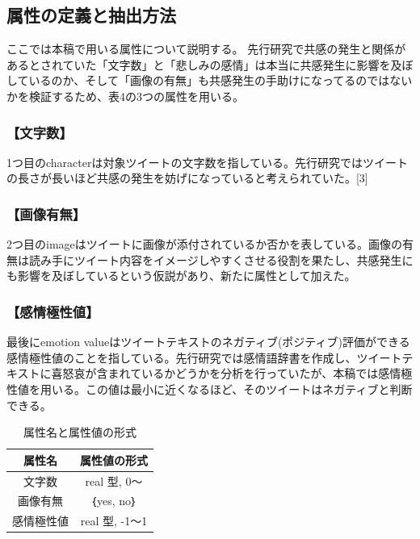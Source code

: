 \documentclass[dvipdfmx]{issj}
\begin{document}
\subsection{属性の定義と抽出方法}  %
ここでは本稿で用いる属性について説明する。
先行研究で共感の発生と関係があるとされていた「文字数」と「悲しみの感情」は本当に共感発生に影響を及ぼしているのか、そして「画像の有無」も共感発生の手助けになってるのではないかを検証するため、表4の3つの属性を用いる。


\subsubsection{【文字数】}
1つ目のcharacterは対象ツイートの文字数を指している。先行研究ではツイートの長さが長いほど共感の発生を妨げになっていると考えられていた。[3]

\subsubsection{【画像有無】}
2つ目のimageはツイートに画像が添付されているか否かを表している。画像の有無は読み手にツイート内容をイメージしやすくさせる役割を果たし、共感発生にも影響を及ぼしているという仮説があり、新たに属性として加えた。

\subsubsection{【感情極性値】}
最後にemotion valueはツイートテキストのネガティブ(ポジティブ)評価ができる感情極性値のことを指している。先行研究では感情語辞書を作成し、ツイートテキストに喜怒哀が含まれているかどうかを分析を行っていたが、本稿では感情極性値を用いる。この値は最小に近くなるほど、そのツイートはネガティブと判断できる。






\begin{table}[t]\centering
\caption{属性名と属性値の形式}\label{tbl:font}
\begin{small}
\begin{tabular}{|c|c|} \hline
属性名            & 属性値の形式\\\hline\hline
文字数         & real 型, 0～\\\hline
画像有無 & ｛yes, no｝\\\hline
感情極性値     &  real 型, -1～1\\\hline
\end{tabular}
\end{small}
\end{table}
\end{document}
